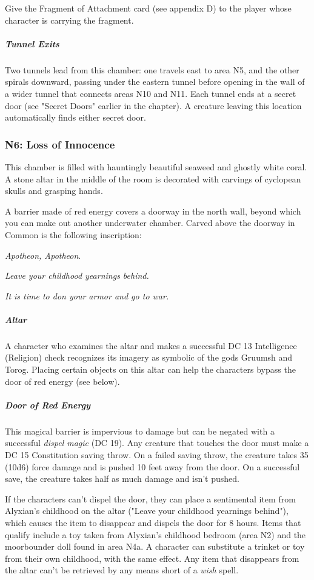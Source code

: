 \documentclass[10pt,a4paper,twoside,bg=print,twocolumn,openany,nodeprecatedcode]{dndbook}
\begin{document}
Give the Fragment of Attachment card (see appendix D) to the player whose character is carrying the fragment.

\subparagraph{Tunnel Exits}
Two tunnels lead from this chamber: one travels east to area N5, and the other spirals downward, passing under the eastern tunnel before opening in the wall of a wider tunnel that connects areas N10 and N11. Each tunnel ends at a secret door (see "Secret Doors" earlier in the chapter). A creature leaving this location automatically finds either secret door.

\subsubsection{N6: Loss of Innocence}
\begin{DndReadAloud}{}
This chamber is filled with hauntingly beautiful seaweed and ghostly white coral. A stone altar in the middle of the room is decorated with carvings of cyclopean skulls and grasping hands.

A barrier made of red energy covers a doorway in the north wall, beyond which you can make out another underwater chamber. Carved above the doorway in Common is the following inscription:

\textit{Apotheon, Apotheon}.

\textit{Leave your childhood yearnings behind.}

\textit{It is time to don your armor and go to war.}

\end{DndReadAloud}

\subparagraph{Altar}
A character who examines the altar and makes a successful DC 13 Intelligence (Religion) check recognizes its imagery as symbolic of the gods Gruumsh and Torog. Placing certain objects on this altar can help the characters bypass the door of red energy (see below).

\subparagraph{Door of Red Energy}
This magical barrier is impervious to damage but can be negated with a successful \textit{dispel magic} (DC 19). Any creature that touches the door must make a DC 15 Constitution saving throw. On a failed saving throw, the creature takes 35 (10d6) force damage and is pushed 10 feet away from the door. On a successful save, the creature takes half as much damage and isn't pushed.

If the characters can't dispel the door, they can place a sentimental item from Alyxian's childhood on the altar ("Leave your childhood yearnings behind"), which causes the item to disappear and dispels the door for 8 hours. Items that qualify include a toy taken from Alyxian's childhood bedroom (area N2) and the moorbounder doll found in area N4a. A character can substitute a trinket or toy from their own childhood, with the same effect. Any item that disappears from the altar can't be retrieved by any means short of a \textit{wish} spell.
\end{document}
